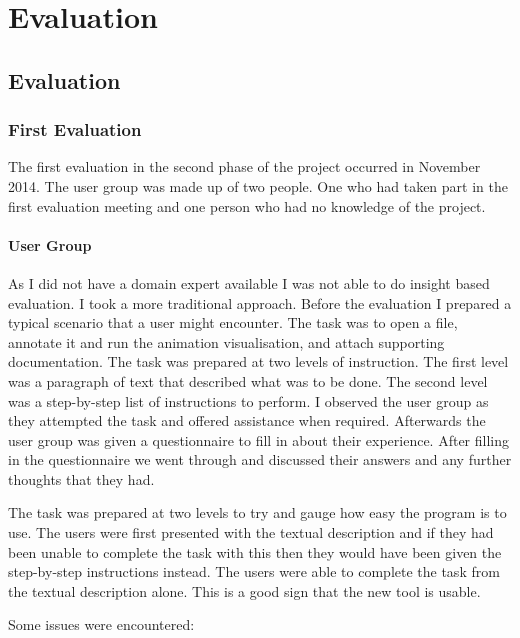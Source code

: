 \chapter{Evaluation}
\label{chap:eval}
\section{Evaluation}

\subsection{First Evaluation}

The first evaluation in the second phase of the project occurred in November 2014.  The user group was made up of two people.  One who had taken part in the first evaluation meeting and one person who had no knowledge of the project.

\subsubsection{User Group}

As I did not have a domain expert available I was not able to do insight based evaluation.  I took a more traditional approach.  Before the evaluation I prepared a typical scenario that a user might encounter.  The task was to open a file, annotate it and run the animation visualisation, and attach supporting documentation.  The task was prepared at two levels of instruction.  The first level was a paragraph of text that described what was to be done.  The second level was a step-by-step list of instructions to perform.  I observed the user group as they attempted the task and offered assistance when required.  Afterwards the user group was given a questionnaire to fill in about their experience. After filling in the questionnaire we went through and discussed their answers and any further thoughts that they had.

The task was prepared at two levels to try and gauge how easy the program is to use.  The users were first presented with the textual description and if they had been unable to complete the task with this then they would have been given the step-by-step instructions instead.  The users were able to complete the task from the textual description alone.  This is a good sign that the new tool is usable.

Some issues were encountered:


